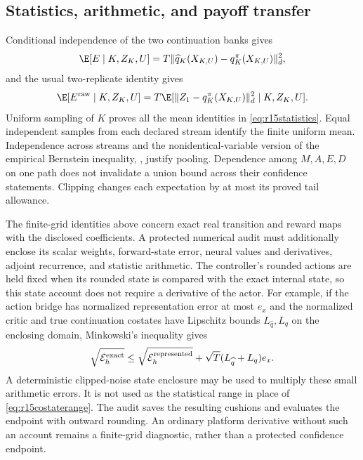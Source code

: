 \subsection{Statistics, arithmetic, and payoff transfer}
Conditional independence of the two continuation banks gives
\[
 \E[E\mid K,Z_K,U]
       =T\|\widehat q_K(X_{K,U})-q_K^\pi(X_{K,U})\|_d^2,
\]
and the usual two-replicate identity gives
\[
\E[E^{\rm raw}\mid K,Z_K,U]=
T\E[\|Z_1-q_K^\pi(X_{K,U})\|_d^2\mid K,Z_K,U].
\]
Uniform sampling of $K$ proves all the mean identities in
\eqref{eq:r15statistics}. Equal independent samples from each
declared stream identify the finite uniform mean. Independence across
streams and the nonidentical-variable version of the empirical
Bernstein inequality, \citet[Theorem~11]{maurer2009}, justify pooling.
Dependence among $M,A,E,D$ on one path does not invalidate a union
bound across their confidence statements. Clipping changes each
expectation by at most its proved tail allowance.

The finite-grid identities above concern exact real transition and
reward maps with the disclosed coefficients. A protected numerical
audit must additionally enclose its scalar weights, forward-state
error, neural values and derivatives, adjoint recurrence, and statistic
arithmetic. The controller's rounded actions are held fixed when its
rounded state is compared with the exact internal state, so this state
account does not require a derivative of the actor. For example, if
the action bridge has normalized representation error at most $e_x$
and the normalized critic and true continuation costates have
Lipschitz bounds $L_{\widehat q},L_q$ on the enclosing domain,
Minkowski's inequality gives
\[
 \sqrt{\mathcal E_h^{\rm exact}}
 \leq\sqrt{\mathcal E_h^{\rm represented}}
              +\sqrt T(L_{\widehat q}+L_q)e_x.
\]
A deterministic clipped-noise state enclosure may be used to multiply
these small arithmetic errors. It is not used as the statistical
range in place of \eqref{eq:r15costaterange}. The audit saves the
resulting cushions and evaluates the endpoint with outward rounding.
An ordinary platform derivative without such an account remains a
finite-grid diagnostic, rather than a protected confidence endpoint.

